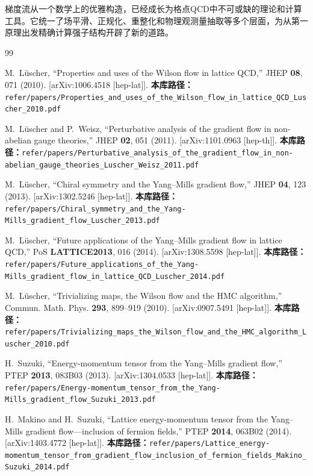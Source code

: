 \documentclass[12pt,a4paper]{ctexart}
\theoremstyle{definition}
\begin{document}
梯度流从一个数学上的优雅构造，已经成长为格点QCD中不可或缺的理论和计算工具。它统一了场平滑、正规化、重整化和物理观测量抽取等多个层面，为从第一原理出发精确计算强子结构开辟了新的道路。


\begin{thebibliography}{99}

M.~L\"uscher,
``Properties and uses of the Wilson flow in lattice QCD,''
JHEP \textbf{08}, 071 (2010).
[arXiv:1006.4518 [hep-lat]].
\textbf{本库路径：}\texttt{refer/papers/Properties\_and\_uses\_of\_the\_Wilson\_flow\_in\_lattice\_QCD\_Luscher\_2010.pdf}

M.~L\"uscher and P.~Weisz,
``Perturbative analysis of the gradient flow in non-abelian gauge theories,''
JHEP \textbf{02}, 051 (2011).
[arXiv:1101.0963 [hep-th]].
\textbf{本库路径：}\texttt{refer/papers/Perturbative\_analysis\_of\_the\_gradient\_flow\_in\_non-abelian\_gauge\_theories\_Luscher\_Weisz\_2011.pdf}

M.~L\"uscher,
``Chiral symmetry and the Yang--Mills gradient flow,''
JHEP \textbf{04}, 123 (2013).
[arXiv:1302.5246 [hep-lat]].
\textbf{本库路径：}\texttt{refer/papers/Chiral\_symmetry\_and\_the\_Yang-Mills\_gradient\_flow\_Luscher\_2013.pdf}

M.~L\"uscher,
``Future applications of the Yang--Mills gradient flow in lattice QCD,''
PoS \textbf{LATTICE2013}, 016 (2014).
[arXiv:1308.5598 [hep-lat]].
\textbf{本库路径：}\texttt{refer/papers/Future\_applications\_of\_the\_Yang-Mills\_gradient\_flow\_in\_lattice\_QCD\_Luscher\_2014.pdf}

M.~L\"uscher,
``Trivializing maps, the Wilson flow and the HMC algorithm,''
Commun. Math. Phys. \textbf{293}, 899--919 (2010).
[arXiv:0907.5491 [hep-lat]].
\textbf{本库路径：}\texttt{refer/papers/Trivializing\_maps\_the\_Wilson\_flow\_and\_the\_HMC\_algorithm\_Luscher\_2010.pdf}

H.~Suzuki,
``Energy-momentum tensor from the Yang--Mills gradient flow,''
PTEP \textbf{2013}, 083B03 (2013).
[arXiv:1304.0533 [hep-lat]].
\textbf{本库路径：}\texttt{refer/papers/Energy-momentum\_tensor\_from\_the\_Yang-Mills\_gradient\_flow\_Suzuki\_2013.pdf}

H.~Makino and H.~Suzuki,
``Lattice energy-momentum tensor from the Yang--Mills gradient flow---inclusion of fermion fields,''
PTEP \textbf{2014}, 063B02 (2014).
[arXiv:1403.4772 [hep-lat]].
\textbf{本库路径：}\texttt{refer/papers/Lattice\_energy-momentum\_tensor\_from\_gradient\_flow\_inclusion\_of\_fermion\_fields\_Makino\_Suzuki\_2014.pdf}


\end{thebibliography}
\end{document}
